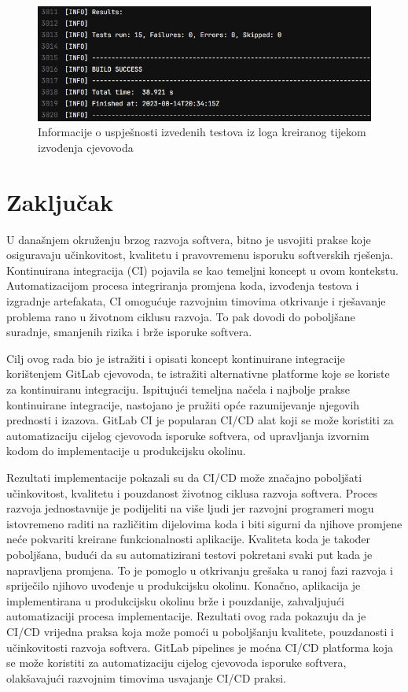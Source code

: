 \documentclass[a4paper,12pt,oneside]{article}
\begin{document}
\begin{figure}
    \centering
    \includegraphics[width=0.6\linewidth]{Slike/test-log.png}
    \caption{Informacije o uspješnosti izvedenih testova iz loga kreiranog tijekom izvođenja cjevovoda}
    \label{fig:test-log}
\end{figure}

\newpage
\section*{Zaključak}

U današnjem okruženju brzog razvoja softvera, bitno je usvojiti prakse koje osiguravaju učinkovitost, kvalitetu i pravovremenu isporuku softverskih rješenja. Kontinuirana integracija (CI) pojavila se kao temeljni koncept u ovom kontekstu. Automatizacijom procesa integriranja promjena koda, izvođenja testova i izgradnje artefakata, CI omogućuje razvojnim timovima otkrivanje i rješavanje problema rano u životnom ciklusu razvoja. To pak dovodi do poboljšane suradnje, smanjenih rizika i brže isporuke softvera.

Cilj ovog rada bio je istražiti i opisati koncept kontinuirane integracije korištenjem GitLab cjevovoda, te istražiti alternativne platforme koje se koriste za kontinuiranu integraciju. Ispitujući temeljna načela i najbolje prakse kontinuirane integracije, nastojano je pružiti opće razumijevanje njegovih prednosti i izazova. GitLab CI je popularan CI/CD alat koji se može koristiti za automatizaciju cijelog cjevovoda isporuke softvera, od upravljanja izvornim kodom do implementacije u produkcijsku okolinu.

Rezultati implementacije pokazali su da CI/CD može značajno poboljšati učinkovitost, kvalitetu i pouzdanost životnog ciklusa razvoja softvera. Proces razvoja jednostavnije je podijeliti na više ljudi jer razvojni programeri mogu istovremeno raditi na različitim dijelovima koda i biti sigurni da njihove promjene neće pokvariti kreirane funkcionalnosti aplikacije. Kvaliteta koda je također poboljšana, budući da su automatizirani testovi pokretani svaki put kada je napravljena promjena. To je pomoglo u otkrivanju grešaka u ranoj fazi razvoja i spriječilo njihovo uvođenje u produkcijsku okolinu. Konačno, aplikacija je implementirana u produkcijsku okolinu brže i pouzdanije, zahvaljujući automatizaciji procesa implementacije.
Rezultati ovog rada pokazuju da je CI/CD vrijedna praksa koja može pomoći u poboljšanju kvalitete, pouzdanosti i učinkovitosti razvoja softvera. GitLab pipelines je moćna CI/CD platforma koja se može koristiti za automatizaciju cijelog cjevovoda isporuke softvera, olakšavajući razvojnim timovima usvajanje CI/CD praksi.
\end{document}
